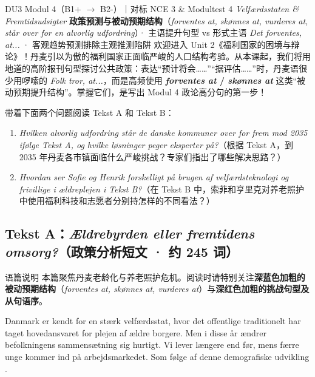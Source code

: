 {DU3 Modul 4（B1+ $\rightarrow$ B2-）｜对标 NCE 3 \& Modultest 4 \textit{Velfærdsstaten \& Fremtidsudsigter}}
{\textbf{政策预测与被动预期结构}（\textit{forventes at, skønnes at, vurderes at, står over for en alvorlig udfordring}）· 主语提升句型 vs 形式主语 \textit{Det forventes, at...} · 客观趋势预测排除主观推测陷阱}
{欢迎进入 Unit 2《福利国家的困境与辩论》！丹麦引以为傲的福利国家正面临严峻的人口结构考验。从本课起，我们将用地道的高阶报刊句型探讨公共政策：表达“预计将会……”“据评估……”时，丹麦语很少用啰嗦的 \textit{Folk tror, at...}，而是高频使用 \textbf{\textit{forventes at} / \textit{skønnes at}} 这类“被动预期提升结构”。掌握它们，是写出 Modul 4 政论高分句的第一步！}

\begin{foerduleaeser}
带着下面两个问题阅读 Tekst A 和 Tekst B：
\begin{enumerate}
  \item \textit{Hvilken alvorlig udfordring står de danske kommuner over for frem mod 2035 ifølge Tekst A, og hvilke løsninger peger eksperter på?}（根据 Tekst A，到 2035 年丹麦各市镇面临什么严峻挑战？专家们指出了哪些解决思路？）
  \item \textit{Hvordan ser Sofie og Henrik forskelligt på brugen af velfærdsteknologi og frivillige i ældreplejen i Tekst B?}（在 Tekst B 中，索菲和亨里克对养老照护中使用福利科技和志愿者分别持怎样的不同看法？）
\end{enumerate}
\end{foerduleaeser}


\subsection*{Tekst A：\textit{Ældrebyrden eller fremtidens omsorg?}（政策分析短文 · 约 245 词）}

\begin{tipbox}{语篇说明}
本篇聚焦丹麦老龄化与养老照护危机。阅读时请特别关注\textbf{\color{NCDNavy}深蓝色加粗的被动预期结构}（\textit{forventes at, skønnes at, vurderes at}）与\textbf{\color{NCDRed}深红色加粗的挑战句型及从句语序}。
\end{tipbox}

Danmark er kendt for en stærk velfærdsstat, hvor det offentlige traditionelt har taget hovedansvaret for plejen af ældre borgere. Men i disse år ændrer befolkningens sammensætning sig hurtigt. Vi lever længere end før, mens færre unge kommer ind på arbejdsmarkedet. Som følge af denne demografiske udvikling .

